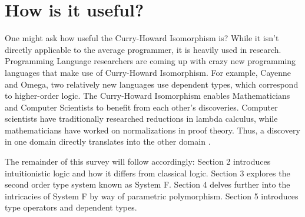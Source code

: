 \section{How is it useful?}
One might ask how useful the Curry-Howard Isomorphism is? While it isn't directly applicable to the average programmer, it is heavily used in research. Programming Language researchers are coming up with crazy new programming languages that make use of Curry-Howard Isomorphism. For example, Cayenne and Omega, two relatively new languages use dependent types, which correspond to higher-order logic. The Curry-Howard Isomorphism enables Mathematicians and Computer Scientists to benefit from each other's discoveries. Computer scientists have traditionally researched reductions in lambda calculus, while mathematicians have worked on normalizations in proof theory. Thus, a discovery in one domain directly translates into the other domain \cite{CHnotes}.

The remainder of this survey will follow accordingly: Section 2 introduces intuitionistic logic and how it differs from classical logic. Section 3 explores the second order type system known as System F. Section 4 delves further into the intricacies of System F by way of parametric polymorphism. Section 5 introduces type operators and dependent types.
